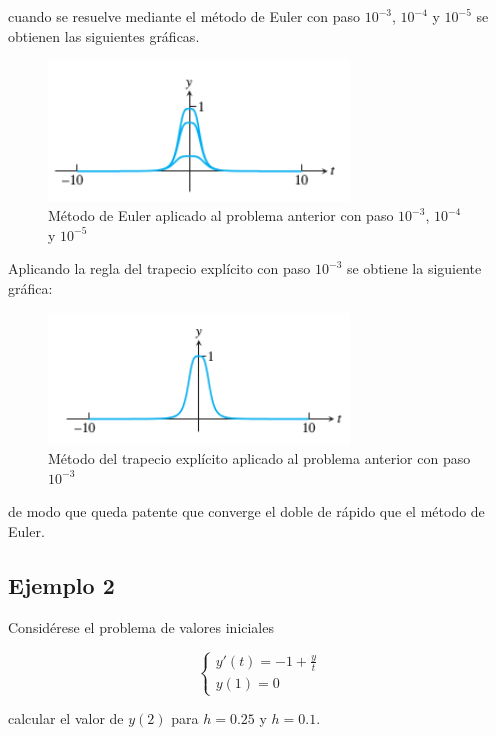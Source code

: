 \documentclass{article}
\theoremstyle{theorem-style}  %
\theoremstyle{definition-style}
\theoremstyle{example-style}
\begin{document}
cuando se resuelve mediante el método de Euler con paso $10^{-3}$, $10^{-4}$ y  $10^{-5}$ se obtienen las siguientes gráficas. 

		\begin{figure}[H]
			\centering
			\includegraphics[width=8cm]{./Images/ej1-1.png}
			\caption{Método de Euler aplicado al problema anterior con paso $10^{-3}$, $10^{-4}$ y  $10^{-5}$} 
			\label{fig:ej1-1}
		\end{figure}
		
		Aplicando la regla del trapecio explícito con paso $10^{-3}$ se obtiene la siguiente gráfica:
		
		\begin{figure}[H]
			\centering
			\includegraphics[width=8cm]{./Images/ej1-2.png}
			\caption{Método del trapecio explícito aplicado al problema anterior con paso $10^{-3}$} 
			\label{fig:ej1-2}
		\end{figure}
		
		de modo que queda patente que converge el doble de rápido que el método de Euler. 
		
\subsection{Ejemplo 2} \label{ejemplo2}

Considérese el problema de valores iniciales

		\begin{equation*}
			\begin{cases}
			y'(t) = -1 + \frac{y}{t} \\
			y(1) = 0 
			\end{cases}
		\end{equation*}
		
calcular el valor de $y(2)$ para $h=0.25$ y $h=0.1$.
	
\end{document}
